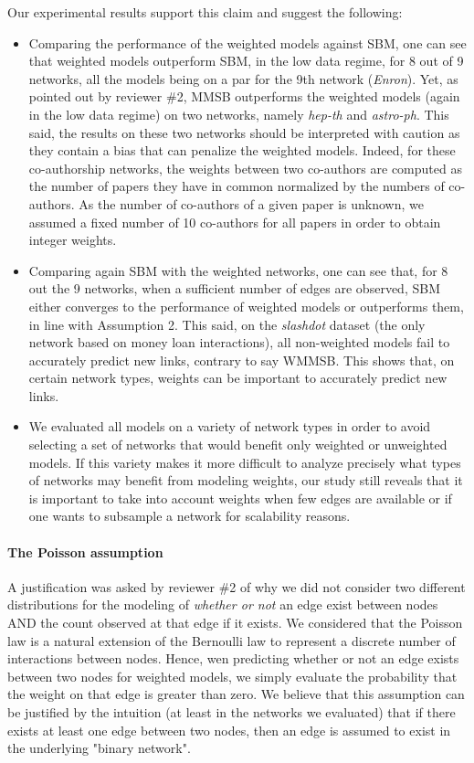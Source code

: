 \documentclass{article}
\begin{document}
%
Our experimental results support this claim and suggest the following:
%
\begin{itemize}
\item Comparing the performance of the weighted models against SBM, one can see that weighted models outperform SBM, in the low data regime, for 8 out of 9 networks, all the models being on a par for the 9th network (\textit{Enron}). Yet, as pointed out by reviewer \#2, MMSB outperforms the weighted models (again in the low data regime) on two networks, namely \textit{hep-th} and \textit{astro-ph}. This said, the results on these two networks should be interpreted with caution as they contain a bias that can penalize the weighted models. Indeed, for these co-authorship networks, the weights between two co-authors are computed as the number of papers they have in common normalized by the numbers of co-authors. As the number of co-authors of a given paper is unknown, we assumed a fixed number of 10 co-authors for all papers in order to obtain integer weights.
\item Comparing again SBM with the weighted networks, one can see that, for 8 out the 9 networks, when a sufficient number of edges are observed, SBM either converges to the performance of weighted models or outperforms them, in line with Assumption 2. This said, on the \textit{slashdot} dataset (the only network based on money loan interactions), all non-weighted models fail to accurately predict new links, contrary to say WMMSB. This shows that, on certain network types, weights can be important to accurately predict new links.
\item We evaluated all models on a variety of network types in order to avoid selecting a set of networks that would benefit only weighted or unweighted models. If this variety makes it more difficult to analyze precisely what types of networks may benefit from modeling weights, our study still reveals that it is important to take into account weights when few edges are available or if one wants to subsample a network for scalability reasons.
\end{itemize}

\paragraph{The Poisson assumption} A justification was asked by reviewer \#2 of why we did not consider two different distributions for the modeling of \emph{whether or not} an edge exist between nodes AND the count observed at that edge if it exists. We considered that the Poisson law is a natural extension of the Bernoulli law to represent a discrete number of interactions between nodes. Hence, wen predicting whether or not an edge exists between two nodes for weighted models, we simply evaluate the probability that the weight on that edge is greater than zero. We believe that this assumption can be justified by the intuition (at least in the networks we evaluated) that if there exists at least one edge between two nodes, then an edge is assumed to exist in the underlying "binary network".
\end{document}
